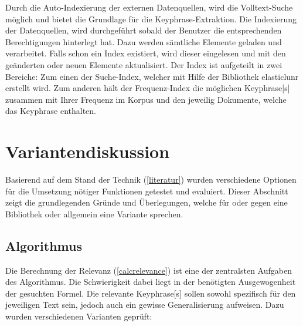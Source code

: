 
Durch die Auto-Indexierung der externen Datenquellen, wird die Volltext-Suche möglich und bietet die Grundlage für die \gls{Keyphrase}-Extraktion. Die Indexierung der Datenquellen, wird durchgeführt sobald der Benutzer die entsprechenden Berechtigungen hinterlegt hat. Dazu werden sämtliche Elemente geladen und verarbeitet. Falls schon ein Index existiert, wird dieser eingelesen und mit den ge\-än\-der\-ten oder neuen Elemente aktualisiert. Der Index ist aufgeteilt in zwei Bereiche: Zum einen der Suche-Index, welcher mit Hilfe der Bibliothek \gls{elasticlunr} erstellt wird. Zum anderen hält der Frequenz-Index die möglichen \gls{Keyphrase}[s] zusammen mit Ihrer Frequenz im Korpus und den jeweilig Dokumente, welche das \gls{Keyphrase} enthalten.


\section{Variantendiskussion}



Basierend auf dem Stand der Technik (\autoref{literatur}) wurden verschiedene Optionen für die Umsetzung nötiger Funktionen getestet und evaluiert. Dieser Abschnitt zeigt die grundlegenden Gründe und Üb\-er\-le\-gun\-gen, welche für oder gegen eine Bibliothek oder allgemein eine Variante sprechen.



\subsection{Algorithmus}


Die Berechnung der Relevanz (\autoref{calcrelevance}) ist eine der zentralsten Aufgaben des Algorithmus. Die Schwierigkeit dabei liegt in der benötigten Ausgewogenheit der gesuchten Formel. Die relevante \gls{Keyphrase}[s] sollen sowohl spezifisch für den jeweiligen Text sein, jedoch auch ein gewisse Generalisierung aufweisen. Dazu wurden verschiedenen Varianten geprüft:

